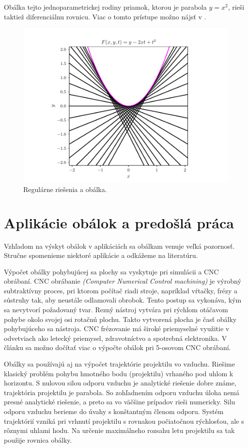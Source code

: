 Obálka tejto jednoparametrickej rodiny priamok, ktorou je parabola $y = x^2$, rieši taktiež diferenciálnu rovnicu. Viac o tomto prístupe možno nájsť v \cite{Gro97}.

\begin{figure}[H]
	\centering
	\includegraphics{images/odr.pdf}
	\caption{Regulárne riešenia a obálka.}
	\label{fig:odr}
\end{figure}

\section{Aplikácie obálok a predošlá práca}
Vzhľadom na výskyt obálok v aplikáciách sa obálkam venuje veľká pozornosť. Stručne spomenieme niektoré aplikácie a odkážeme na literatúru. 

Výpočet obálky pohybujúcej sa plochy sa vyskytuje pri simulácii a CNC obrábaní. CNC obrábanie \textit{(Computer Numerical Control machining)}  je výrobný subtraktívny proces, pri ktorom počítač riadi stroje, napríklad vŕtačky, frézy a sústruhy tak, aby neustále odlamovali obrobok. Tento postup sa vykonáva, kým sa nevytvorí požadovaný tvar. Rezný nástroj vytvára pri rýchlom otáčavom pohybe okolo svojej osi rotačnú plochu. Takto vytvorená plocha je časť obálky pohybujúceho sa nástroja. CNC frézovanie má široké priemyselné využitie v odvetviach ako letecký priemysel, zdravotníctvo a spotrebná elektronika. V článku \cite{Skop20} sa možno dočítať viac o výpočte obálok pri 5-osovom CNC obrábaní.  

Obálky sa používajú aj na výpočet trajektórie projektilu vo vzduchu. Riešime klasický problém pohybu hmotného bodu (projektilu) vrhaného pod uhlom k horizontu. S nulovou silou odporu vzduchu je analytické riešenie dobre známe, trajektória projektilu je parabola. So zohľadnením odporu vzduchu úloha nemá presné analytické riešenie, a preto sa vo väčšine prípadov rieši numericky. Silu odporu vzduchu berieme do úvahy s konštantným členom odporu. Systém trajektórií vzniká pri vrhnutí projektilu s rovnakou počiatočnou rýchlosťou, ale s rôznymi uhlami hodu. Na určenie maximálneho rozsahu letu projektilu sa tak použije rovnica obálky. \cite{Chud09}

